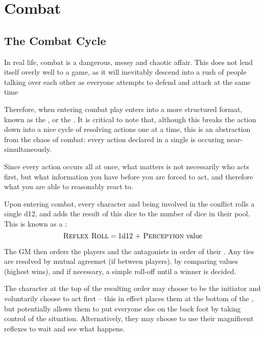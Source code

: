 
\chapter{Combat}

\section{The Combat Cycle}

In real life, combat is a dangerous, messy and chaotic affair. This does not lend itself overly well to a game, as it will inevitably descend into a rush of people talking over each other as everyone attempts to defend and attack at the same time 

Therefore, when entering combat play enters into a more structured format, known as the , or the . It is critical to note that, although this breaks the action down into a nice cycle of resolving actions one at a time, this is an abstraction from the chaos of combat: every action declared in a single  is occuring near-simultaneously.

Since every action occurs all at once, what matters is not necessarily who acts first, but what information you have before you are forced to act, and therefore what you are able to reasonably react to.

Upon entering combat, every character and being involved in the conflict rolls a single d12, and adds the result of this dice to the number of dice in their  pool. This is known as a :
$$ \text{\textsc{Reflex Roll}} = \text{1d12 + \textsc{Perception} value} $$

The GM then orders the players and the antagonists in order of their . Any ties are resolved by mutual agreemet (if between players), by comparing  values (highest wins), and if necessary, a simple roll-off until a winner is decided.

The character at the top of the resulting  order may choose to be the initiator and voluntarily choose to act first -- this in effect places them at the bottom of the , but potentially allows them to put everyone else on the back foot by taking control of the situation. Alternatively, they may choose to use their magnificent reflexes to wait and see what happens.

